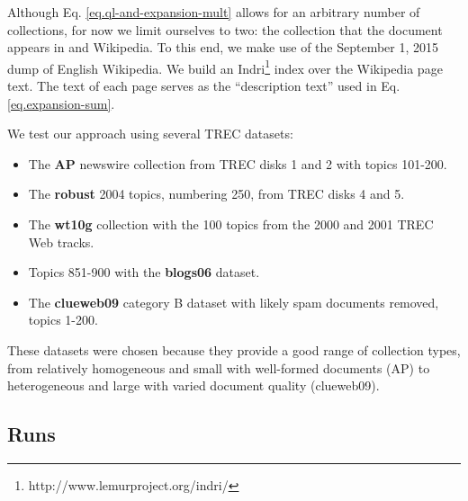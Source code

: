 \documentclass{article}
\begin{document}
Although Eq. \ref{eq.ql-and-expansion-mult} allows for an arbitrary number of collections, for now we limit ourselves to two: the collection that the document appears in and Wikipedia. To this end, we make use of the September 1, 2015 dump of English Wikipedia. We build an Indri\footnote{http://www.lemurproject.org/indri/} index over the Wikipedia page text. The text of each page serves as the ``description text'' used in Eq. \ref{eq.expansion-sum}.

We test our approach using several TREC datasets:
\begin{itemize}
	\item The \textbf{AP} newswire collection from TREC disks 1 and 2 with topics 101-200.
	\item The \textbf{robust} 2004 topics, numbering 250, from TREC disks 4 and 5.
	\item The \textbf{wt10g} collection with the 100 topics from the 2000 and 2001 TREC Web tracks.
	\item Topics 851-900 with the \textbf{blogs06} dataset.
	\item The \textbf{clueweb09} category B dataset with likely spam documents removed, topics 1-200.
\end{itemize}

These datasets were chosen because they provide a good range of collection types, from relatively homogeneous and small with well-formed documents (AP) to heterogeneous and large with varied document quality (clueweb09).


\subsection{Runs}\label{section.evaluation.runs}

\end{document}
